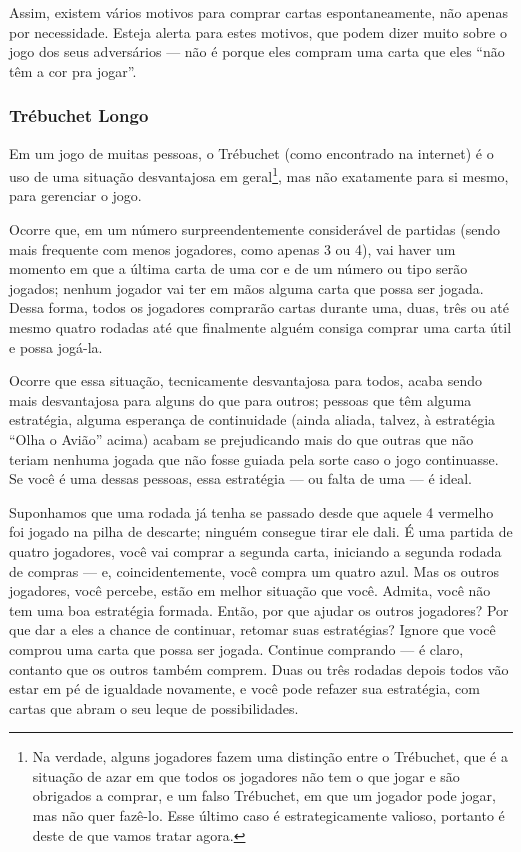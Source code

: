 Assim, existem vários motivos para comprar cartas espontaneamente, não apenas por necessidade. Esteja alerta para estes motivos, que podem dizer muito sobre o jogo dos seus adversários --- não é porque eles compram uma carta que eles ``não têm a cor pra jogar''.

\subsubsection{Trébuchet Longo}

\label{trebuchetlongo}

Em um jogo de muitas pessoas, o Trébuchet (como encontrado na internet) é o uso de uma situação desvantajosa em geral\footnote{Na verdade, alguns jogadores fazem uma distinção entre o Trébuchet, que é a situação de azar em que todos os jogadores não tem o que jogar e são obrigados a comprar, e um falso Trébuchet, em que um jogador pode jogar, mas não quer fazê-lo. Esse último caso é estrategicamente valioso, portanto é deste de que vamos tratar agora.}, mas não exatamente para si mesmo, para gerenciar o jogo.

Ocorre que, em um número surpreendentemente considerável de partidas (sendo mais frequente com menos jogadores, como apenas 3 ou 4), vai haver um momento em que a última carta de uma cor e de um número ou tipo serão jogados; nenhum jogador vai ter em mãos alguma carta que possa ser jogada. Dessa forma, todos os jogadores comprarão cartas durante uma, duas, três ou até mesmo quatro rodadas até que finalmente alguém consiga comprar uma carta útil e possa jogá-la.

Ocorre que essa situação, tecnicamente desvantajosa para todos, acaba sendo mais desvantajosa para alguns do que para outros; pessoas que têm alguma estratégia, alguma esperança de continuidade (ainda aliada, talvez, à estratégia ``Olha o Avião'' acima) acabam se prejudicando mais do que outras que não teriam nenhuma jogada que não fosse guiada pela sorte caso o jogo continuasse. Se você é uma dessas pessoas, essa estratégia --- ou falta de uma --- é ideal.

Suponhamos que uma rodada já tenha se passado desde que aquele 4 vermelho foi jogado na pilha de descarte; ninguém consegue tirar ele dali. É uma partida de quatro jogadores, você vai comprar a segunda carta, iniciando a segunda rodada de compras --- e, coincidentemente, você compra um quatro azul. Mas os outros jogadores, você percebe, estão em melhor situação que você. Admita, você não tem uma boa estratégia formada. Então, por que ajudar os outros jogadores? Por que dar a eles a chance de continuar, retomar suas estratégias? Ignore que você comprou uma carta que possa ser jogada. Continue comprando --- é claro, contanto que os outros também comprem. Duas ou três rodadas depois todos vão estar em pé de igualdade novamente, e você pode refazer sua estratégia, com cartas que abram o seu leque de possibilidades.

